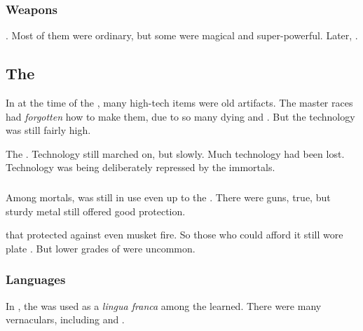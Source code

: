 \subsubsection{Weapons}
. 
Most of them were ordinary, but some were magical and super-powerful. 
Later, . 









\subsection{The \Thirdbanewar}
In \Azmith at the time of the , many high-tech items were old artifacts. 
The master races had \emph{forgotten} how to make them, due to so many dying and . 
But the technology was still fairly high. 

The . 
Technology still marched on, but slowly.
Much technology had been lost. 
Technology was being deliberately repressed by the immortals. 





\subsubsection{\Armour}
Among mortals, \armour was still in use even up to the \thirdbanewar. 
There were guns, true, but sturdy metal \armour still offered good protection. 

 that protected against even musket fire. 
So those who could afford it still wore plate \armour.
But lower grades of \armour were uncommon.





\subsubsection{Languages}
In \Velcad, the  was used as a \emph{lingua franca} among the learned. 
There were many vernaculars, including  and . 





